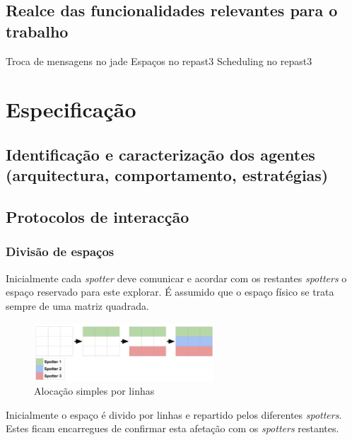 \documentclass[12pt]{report}
\begin{document}
\section{Realce das funcionalidades relevantes para o trabalho}
Troca de mensagens no jade
Espaços no repast3
Scheduling no repast3


\chapter{Especificação}
\section{Identificação e caracterização dos agentes (arquitectura, comportamento, estratégias)}

\section{Protocolos de interacção}

\subsection{Divisão de espaços}
Inicialmente cada \emph{spotter} deve comunicar e acordar com os restantes \emph{spotters} o espaço reservado para este explorar.
É assumido que o espaço físico se trata sempre de uma matriz quadrada.

\begin{figure}[h]
  \centering
    \includegraphics[width=0.6\textwidth]{spotter-spaces}
  \caption{\small{Alocação simples por linhas}}
\end{figure}

Inicialmente o espaço é divido por linhas e repartido pelos diferentes \emph{spotters}. Estes ficam encarregues de confirmar esta
afetação com os \emph{spotters} restantes.
\end{document}
